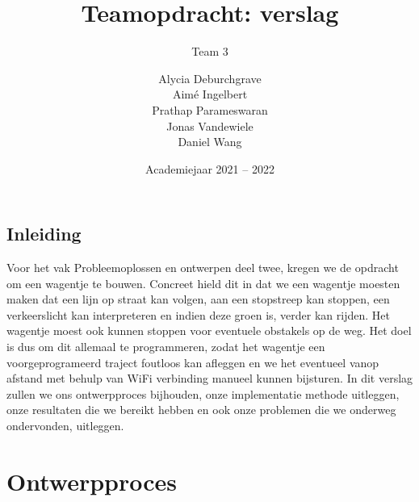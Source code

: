 \documentclass[twoside,kulak]{kulakreport} %
\title{Teamopdracht: verslag}
\subtitle{Team 3}
\author{Alycia Deburchgrave \\ Aimé Ingelbert \\ Prathap Parameswaran \\ Jonas Vandewiele \\ Daniel Wang}
\date{Academiejaar 2021 -- 2022}
\institute{Ingenieurswetenschappen}
\begin{document}


	
	
	
	\titlepage
	
	\tableofcontents
	
	\section*{Inleiding}
	Voor het vak Probleemoplossen en ontwerpen deel twee, kregen we de opdracht om een wagentje te bouwen. Concreet hield dit in dat we een wagentje moesten maken dat een lijn op straat kan volgen, aan een stopstreep kan stoppen, een verkeerslicht kan interpreteren en indien deze groen is, verder kan rijden. Het wagentje moest ook kunnen stoppen voor eventuele obstakels op de weg. Het doel is dus om dit allemaal te programmeren, zodat het wagentje een voorgeprogrameerd traject foutloos kan afleggen en we het eventueel vanop afstand met behulp van WiFi verbinding manueel kunnen bijsturen.
	In dit verslag zullen we ons ontwerpproces bijhouden, onze implementatie methode uitleggen, onze resultaten die we bereikt hebben en ook onze problemen die we onderweg ondervonden, uitleggen. 

	
	
	\chapter{Ontwerpproces}
	
\end{document}
